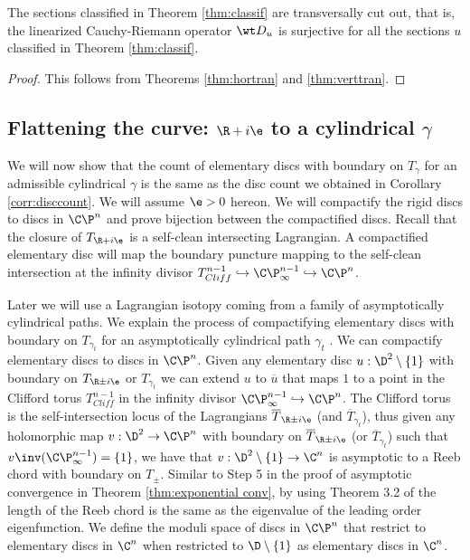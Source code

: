 \begin{Theorem}
\label{thm:regularsimple}
The sections classified in Theorem \ref{thm:classif} are transversally cut out, that is, the linearized Cauchy-Riemann operator $\wt D_u$ is surjective for all the sections $u$ classified in Theorem \ref{thm:classif}.
\end{Theorem}

\begin{proof}
This follows from Theorems \ref{thm:hortran} and \ref{thm:verttran}. 
\end{proof}

\subsection{Flattening the curve:  $\R + i\e$  to a cylindrical $\gamma$}

We will now show that the count of elementary discs with boundary on $T_\gamma$ for an admissible cylindrical $\gamma$ is the same as the disc count we obtained in Corollary \ref{corr:disccount}.  We will assume $\e>0$ hereon. We will compactify the rigid discs to discs in $\C\P^n$ and prove bijection between the compactified discs.  Recall that the closure of $T_{\R +i\e}$ is a self-clean intersecting Lagrangian. A compactified elementary disc will map the  boundary puncture mapping to the self-clean intersection at the infinity divisor $T^{n-1}_{Cliff} \hookrightarrow \C\P^{n-1}_\infty \hookrightarrow \C\P^n$. 



Later we will use a Lagrangian isotopy coming from a family of asymptotically cylindrical paths. We explain the process of compactifying elementary discs with boundary on $T_{\gamma_t}$ for an asymptotically cylindrical path $\gamma_t$ . We can compactify elementary discs to discs in $\C\P^n$. Given any elementary disc $u:\D^2\setminus \{1\}$ with boundary on $T_{\R\pm i\e}$ or $T_{\gamma_t}$ we can extend $u$ to $\overline{u}$ that maps $1$ to a point in the Clifford torus $T^{n-1}_{Cliff}$ in the infinity divisor $\C\P_\infty^{n-1} \hookrightarrow \C\P^n$. The Clifford torus is the self-intersection locus of the Lagrangians $\overline T_{\R\pm i\e}$ (and $\overline T_{\gamma_t}$), thus given any holomorphic map $v: \D^2 \to \C\P^n$ with boundary on $\overline T_{\R\pm i\e}$ (or $\overline T_{\gamma_t}$) such that $v\inv (\C\P^{n-1}_\infty) = \{1\}$, we have that $v: \D^2 \setminus \{1\} \to \C^n$ is asymptotic to  a Reeb chord with boundary on $T_\pm$. Similar to Step 5 in the proof of asymptotic convergence in Theorem \ref{thm:exponential conv}, by using Theorem 3.2 of \cite{schm} the length of the Reeb chord is the same as the eigenvalue of the leading order eigenfunction. We define the moduli space of discs in $\C\P^n$ that restrict to elementary discs in $\C^n$ when restricted to $\D\setminus\{1\}$ as elementary discs in $\C^n$.

